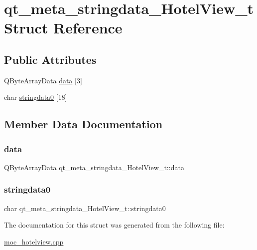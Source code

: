 \hypertarget{structqt__meta__stringdata___hotel_view__t}{}\section{qt\+\_\+meta\+\_\+stringdata\+\_\+\+Hotel\+View\+\_\+t Struct Reference}
\label{structqt__meta__stringdata___hotel_view__t}
\subsection*{Public Attributes}
\begin{DoxyCompactItemize}
\item 
Q\+Byte\+Array\+Data \hyperlink{structqt__meta__stringdata___hotel_view__t_ad335c1e660c3960878dc3e598403537b}{data} \mbox{[}3\mbox{]}
\item 
char \hyperlink{structqt__meta__stringdata___hotel_view__t_af67aa19cb75af7e8f2eb22ea7b41968c}{stringdata0} \mbox{[}18\mbox{]}
\end{DoxyCompactItemize}


\subsection{Member Data Documentation}
\mbox{\label{structqt__meta__stringdata___hotel_view__t_ad335c1e660c3960878dc3e598403537b}} 
\subsubsection{\texorpdfstring{data}{data}}
{\footnotesize\ttfamily Q\+Byte\+Array\+Data qt\+\_\+meta\+\_\+stringdata\+\_\+\+Hotel\+View\+\_\+t\+::data}

\mbox{\label{structqt__meta__stringdata___hotel_view__t_af67aa19cb75af7e8f2eb22ea7b41968c}} 
\subsubsection{\texorpdfstring{stringdata0}{stringdata0}}
{\footnotesize\ttfamily char qt\+\_\+meta\+\_\+stringdata\+\_\+\+Hotel\+View\+\_\+t\+::stringdata0}



The documentation for this struct was generated from the following file\+:\begin{DoxyCompactItemize}
\item 
\hyperlink{moc__hotel_view_8cpp}{moc\+\_\+hotelview.\+cpp}\end{DoxyCompactItemize}
